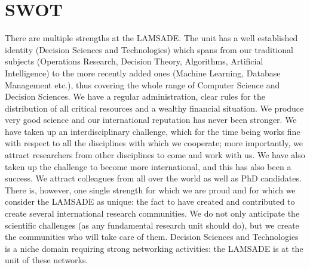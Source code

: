 \section{SWOT}\label{swot}

There are multiple strengths at the LAMSADE. The unit has a well established identity (Decision Sciences and Technologies) which spans from our traditional subjects (Operations Research, Decision Theory, Algorithms, Artificial Intelligence) to the more recently added ones (Machine Learning, Database Management etc.), thus covering the whole range of Computer Science and Decision Sciences. We have a regular administration, clear rules for the distribution of all critical resources and a wealthy financial situation. We produce very good science and our international reputation has never been stronger. We have taken up an interdisciplinary challenge, which for the time being works fine with respect to all the disciplines with which we cooperate; more importantly, we attract researchers from other disciplines to come and work with us. We have also taken up the challenge to become more international, and this has also been a success. We attract colleagues from all over the world as well as PhD candidates. There is, however, one single strength for which we are proud and for which we consider the LAMSADE as unique: the fact to have created and contributed to create several international research communities. We do not only anticipate the scientific challenges (as any fundamental research unit should do), but we create the communities who will take care of them. Decision Sciences and Technologies is a niche domain requiring strong networking activities: the LAMSADE is at the unit of these networks.

